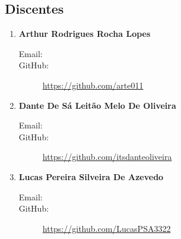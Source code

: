 \documentclass[a4paper,12pt]{article} %
\begin{document}
\subsection*{Discentes}

\begin{enumerate}
    \item \textbf{Arthur Rodrigues Rocha Lopes}
    \begin{description}
        \item [Email:] 
        \item [GitHub:] \url{https://github.com/arte011}
    \end{description}

    \item \textbf{Dante De Sá Leitão Melo De Oliveira}
    \begin{description}
        \item [Email:] 
        \item [GitHub:] \url{https://github.com/itsdanteoliveira}
    \end{description}

    \item \textbf{Lucas Pereira Silveira De Azevedo}
    \begin{description}
        \item [Email:] 
        \item [GitHub:] \url{https://github.com/LucasPSA3322}
    \end{description}
\end{enumerate}
\end{document}
